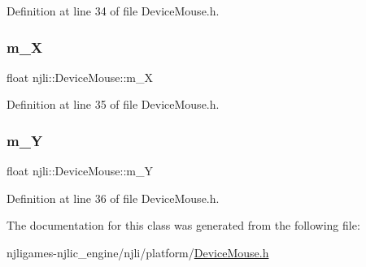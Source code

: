 Definition at line 34 of file Device\+Mouse.\+h.

\mbox{\label{classnjli_1_1_device_mouse_ad62299ae082d8a421bfbcc0934d4512c}} 
\subsubsection{\texorpdfstring{m\+\_\+X}{m\_X}}
{\footnotesize\ttfamily float njli\+::\+Device\+Mouse\+::m\+\_\+X\hspace{0.3cm}{\ttfamily [private]}}



Definition at line 35 of file Device\+Mouse.\+h.

\mbox{\label{classnjli_1_1_device_mouse_a565bc5cfae357af3e49c616c8ea21c82}} 
\subsubsection{\texorpdfstring{m\+\_\+Y}{m\_Y}}
{\footnotesize\ttfamily float njli\+::\+Device\+Mouse\+::m\+\_\+Y\hspace{0.3cm}{\ttfamily [private]}}



Definition at line 36 of file Device\+Mouse.\+h.



The documentation for this class was generated from the following file\+:\begin{DoxyCompactItemize}
\item 
njligames-\/njlic\+\_\+engine/njli/platform/\mbox{\hyperlink{_device_mouse_8h}{Device\+Mouse.\+h}}\end{DoxyCompactItemize}
